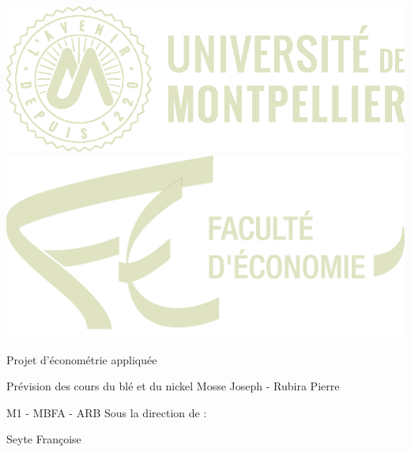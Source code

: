 \documentclass[11pt,a4paper]{article}
\begin{document}
\afterpage{\restoregeometry}
\pagecolor{mytan}\afterpage{\nopagecolor}
\thispagestyle{empty}
\begin{center}
\includegraphics{um3.png} \hspace{5em} \includegraphics[scale=0.23]{eco.png} \par
\vfill
\titlefont \textcolor{light}{Projet d'économétrie appliquée}\par\vspace{0.5cm}
\subtitlefont \textcolor{light}{Prévision des cours du blé et du nickel}
\vfill
\namefont \textcolor{light}{Mosse Joseph - Rubira Pierre}\par\vspace{0.2cm}
\namefont \textcolor{light}{M1 - MBFA - ARB}
\vfill
\namefont \textcolor{light}{Sous la direction de :}\par\vspace{0.2cm}
\namefont \textcolor{light}{Seyte Françoise}
\end{center}

\begin{center}
\end{center}
\end{document}

